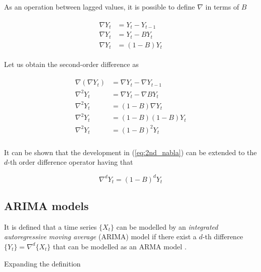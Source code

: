 \begin{property}
	As an operation between lagged values, it is possible to define $\nabla$ in terms of $B$
	
	\begin{align}
		\begin{split}
			\nabla Y_t 	&= Y_t - Y_{t-1} \\
			\nabla Y_t	&= Y_t - BY_t \\
			\nabla Y_t	&= (1-B)Y_t
		\end{split}
	\end{align}
\end{property}

\begin{property}
	Let us obtain the second-order difference as	
	
	\begin{align}
		\label{eq:2nd_nabla}
		\begin{split}
			\nabla (\nabla Y_t)	&= \nabla Y_t - \nabla Y_{t-1} \\
			\nabla^2 Y_t		&= \nabla Y_t - \nabla B Y_{t} \\
			\nabla^2 Y_t		&= (1-B) \nabla Y_{t} \\
			\nabla^2 Y_t		&= (1-B)(1-B) Y_{t} \\
			\nabla^2 Y_t		&= (1-B)^2 Y_{t} \\
		\end{split}
	\end{align}

	It can be shown that the development in (\ref{eq:2nd_nabla}) can be extended to the $d$-th order difference operator having that
	
	\begin{equation}
		\nabla^d Y_t = (1-B)^d Y_t
	\end{equation} 
\end{property}



\subsection{ARIMA models}

It is defined that a time series $\{X_t\}$ can be modelled by an \emph{integrated autoregressive moving average} (ARIMA) model if there exist a $d$-th difference $\{Y_t\} = \nabla^d \{X_t\}$ that can be modelled as an ARMA model \cite{brockwell2016introduction}. 

Expanding the definition 

